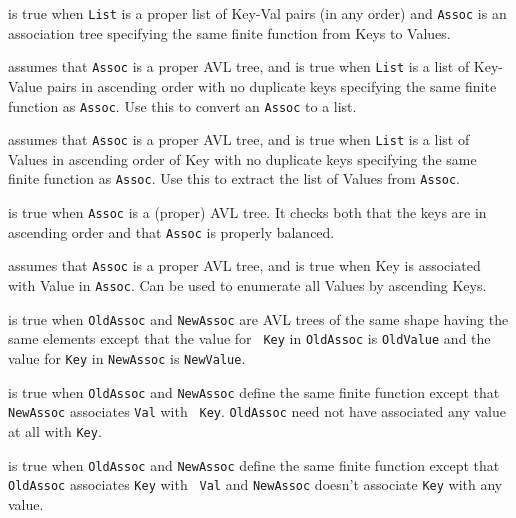 \begin{description}
%
is true when {\tt List} is a proper list of Key-Val pairs (in any
order) and {\tt Assoc} is an association tree specifying the same
finite function from Keys to Values.

   assumes that {\tt Assoc} is a proper AVL tree, and is true when
   {\tt List} is a list of Key-Value pairs in ascending order with no
   duplicate keys specifying the same finite function as {\tt Assoc}.
   Use this to convert an {\tt Assoc} to a list.

   assumes that {\tt Assoc} is a proper AVL tree, and is true when
   {\tt List} is a list of Values in ascending order of Key with no
   duplicate keys specifying the same finite function as {\tt Assoc}.
   Use this to extract the list of Values from {\tt Assoc}.

%
is true when {\tt Assoc} is a (proper) AVL tree.  It checks both that
the keys are in ascending order and that {\tt Assoc} is properly
balanced.  

   assumes that {\tt Assoc} is a proper AVL tree, and is true when
   Key is associated with Value in {\tt Assoc}.  Can be used to enumerate
   all Values by ascending Keys.

%
is true when {\tt OldAssoc} and {\tt NewAssoc} are AVL trees of the
same shape having the same elements except that the value for {\tt
  Key} in {\tt OldAssoc} is {\tt OldValue} and the value for {\tt Key}
in {\tt NewAssoc} is {\tt NewValue}.

is true when {\tt OldAssoc} and {\tt NewAssoc} define the same finite
function except that {\tt NewAssoc} associates {\tt Val} with {\tt
  Key}.  {\tt OldAssoc} need not have associated any value at all with
{\tt Key}.

%
 is true when {\tt OldAssoc} and {\tt NewAssoc} define the same finite
 function except that {\tt OldAssoc} associates {\tt Key} with {\tt
   Val} and {\tt NewAssoc} doesn't associate {\tt Key} with any value.

\end{description}



